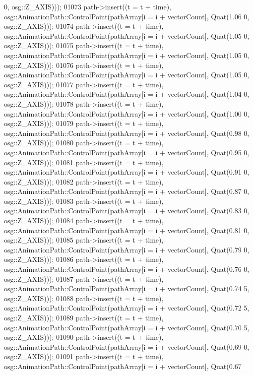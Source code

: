 \begin{DoxyCode}
      0, osg::Z\_AXIS)));
01073     path->insert((t = t + time), osg::AnimationPath::ControlPoint(pathArray[i = i + vectorCount], Quat(1.06
      0, osg::Z\_AXIS)));
01074     path->insert((t = t + time), osg::AnimationPath::ControlPoint(pathArray[i = i + vectorCount], Quat(1.05
      0, osg::Z\_AXIS)));
01075     path->insert((t = t + time), osg::AnimationPath::ControlPoint(pathArray[i = i + vectorCount], Quat(1.05
      0, osg::Z\_AXIS)));
01076     path->insert((t = t + time), osg::AnimationPath::ControlPoint(pathArray[i = i + vectorCount], Quat(1.05
      0, osg::Z\_AXIS)));
01077     path->insert((t = t + time), osg::AnimationPath::ControlPoint(pathArray[i = i + vectorCount], Quat(1.04
      0, osg::Z\_AXIS)));
01078     path->insert((t = t + time), osg::AnimationPath::ControlPoint(pathArray[i = i + vectorCount], Quat(1.00
      0, osg::Z\_AXIS)));
01079     path->insert((t = t + time), osg::AnimationPath::ControlPoint(pathArray[i = i + vectorCount], Quat(0.98
      0, osg::Z\_AXIS)));
01080     path->insert((t = t + time), osg::AnimationPath::ControlPoint(pathArray[i = i + vectorCount], Quat(0.95
      0, osg::Z\_AXIS)));
01081     path->insert((t = t + time), osg::AnimationPath::ControlPoint(pathArray[i = i + vectorCount], Quat(0.91
      0, osg::Z\_AXIS)));
01082     path->insert((t = t + time), osg::AnimationPath::ControlPoint(pathArray[i = i + vectorCount], Quat(0.87
      0, osg::Z\_AXIS)));
01083     path->insert((t = t + time), osg::AnimationPath::ControlPoint(pathArray[i = i + vectorCount], Quat(0.83
      0, osg::Z\_AXIS)));
01084     path->insert((t = t + time), osg::AnimationPath::ControlPoint(pathArray[i = i + vectorCount], Quat(0.81
      0, osg::Z\_AXIS)));
01085     path->insert((t = t + time), osg::AnimationPath::ControlPoint(pathArray[i = i + vectorCount], Quat(0.79
      0, osg::Z\_AXIS)));
01086     path->insert((t = t + time), osg::AnimationPath::ControlPoint(pathArray[i = i + vectorCount], Quat(0.76
      0, osg::Z\_AXIS)));
01087     path->insert((t = t + time), osg::AnimationPath::ControlPoint(pathArray[i = i + vectorCount], Quat(0.74
      5, osg::Z\_AXIS)));
01088     path->insert((t = t + time), osg::AnimationPath::ControlPoint(pathArray[i = i + vectorCount], Quat(0.72
      5, osg::Z\_AXIS)));
01089     path->insert((t = t + time), osg::AnimationPath::ControlPoint(pathArray[i = i + vectorCount], Quat(0.70
      5, osg::Z\_AXIS)));
01090     path->insert((t = t + time), osg::AnimationPath::ControlPoint(pathArray[i = i + vectorCount], Quat(0.69
      0, osg::Z\_AXIS)));
01091     path->insert((t = t + time), osg::AnimationPath::ControlPoint(pathArray[i = i + vectorCount], Quat(0.67

\end{DoxyCode}
